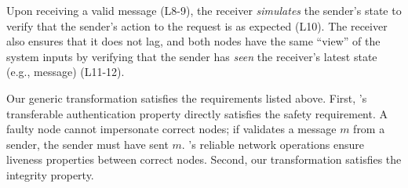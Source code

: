 Upon receiving a valid message (L8-9), the receiver {\em simulates} the sender's state to verify that the sender's action to the request is as expected (L10).  The receiver also ensures that it does not lag, and both nodes have the same ``view'' of the system inputs by verifying that the sender has {\em seen} the receiver's latest state (e.g., message) (L11-12).

Our generic transformation satisfies the requirements listed above. First, \projecttitle{}'s transferable authentication property directly satisfies the safety requirement. A faulty node cannot impersonate correct nodes; if \projecttitle{} validates a message $m$ from a sender, the sender must have sent $m$. \projecttitle{}'s reliable network operations ensure liveness properties between correct nodes. %
% 
Second, our transformation satisfies the integrity property. 

